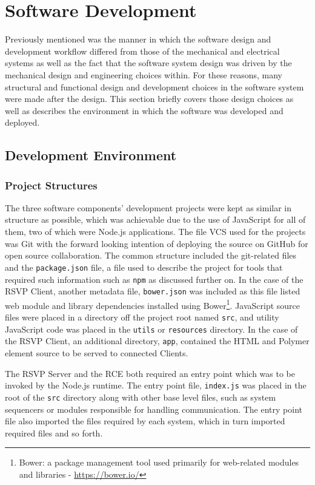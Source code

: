 \section{Software Development}
\label{sec:softwareDevelopment}
  Previously mentioned was the manner in which the software design and development workflow differed from those of the mechanical and electrical systems as well as the fact that the software system design was driven by the mechanical design and engineering choices within. For these reasons, many structural and functional design and development choices in the software system were made after the design. This section briefly covers those design choices as well as describes the environment in which the software was developed and deployed.
    
  \subsection{Development Environment}
    \subsubsection{Project Structures}
      The three software components' development projects were kept as similar in structure as possible, which was achievable due to the use of JavaScript for all of them, two of which were Node.js applications. The file VCS used for the projects was Git with the forward looking intention of deploying the source on GitHub for open source collaboration. The common structure included the git-related files and the \texttt{package.json} file, a file used to describe the project for tools that required such information such as \texttt{npm} as discussed further on. In the case of the RSVP Client, another metadata file, \texttt{bower.json} was included as this file listed web module and library dependencies installed using Bower\footnote{Bower: a package management tool used primarily for web-related modules and libraries - \url{https://bower.io/}}. JavaScript source files were placed in a directory off the project root named \texttt{src}, and utility JavaScript code was placed in the \texttt{utils} or \texttt{resources} directory. In the case of the RSVP Client, an additional directory, \texttt{app}, contained the HTML and Polymer element source to be served to connected Clients.
      
      The RSVP Server and the RCE both required an entry point which was to be invoked by the Node.js runtime. The entry point file, \texttt{index.js} was placed in the root of the \texttt{src} directory along with other base level files, such as system sequencers or modules responsible for handling communication. The entry point file also imported the files required by each system, which in turn imported required files and so forth.
      
